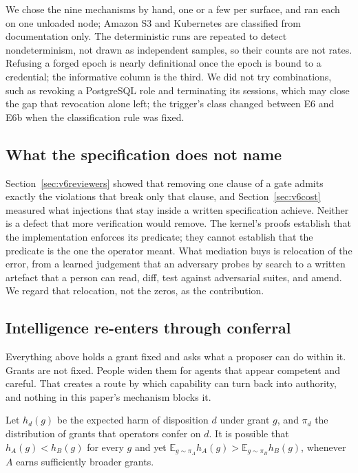  We chose the nine mechanisms by hand, one or a few per surface, and ran each on one
unloaded node; Amazon S3 and Kubernetes are classified from documentation only. The deterministic runs are repeated to
detect nondeterminism, not drawn as independent samples, so their counts are not rates. Refusing a forged epoch is
nearly definitional once the epoch is bound to a credential; the informative column is the third. We did not try
combinations, such as revoking a PostgreSQL role and terminating its sessions, which may close the gap that revocation
alone left; the trigger's class changed between E6 and E6b when the classification rule was fixed.

\subsection{What the specification does not name}

Section~\ref{sec:v6reviewers} showed that removing one clause of a gate admits exactly the violations that break only
that clause, and Section~\ref{sec:v6cost} measured what injections that stay inside a written specification achieve.
Neither is a defect that more verification would remove. The kernel's proofs establish that the
implementation enforces its predicate; they cannot establish that the predicate is the one the operator meant. What
mediation buys is relocation of the error, from a learned judgement that an adversary probes by search to a written
artefact that a person can read, diff, test against adversarial suites, and amend. We regard that relocation, not the
zeros, as the contribution.

\subsection{Intelligence re-enters through conferral}

Everything above holds a grant fixed and asks what a proposer can do within it. Grants are not fixed. People widen
them for agents that appear competent and careful. That creates a route by which capability can turn back into
authority, and nothing in this paper's mechanism blocks it.

\begin{observation}\label{obs:conferral}
Let \(h_d(g)\) be the expected harm of disposition \(d\) under grant \(g\), and \(\pi_d\) the distribution of grants
that operators confer on \(d\). It is possible that \(h_A(g) < h_B(g)\) for every \(g\) and yet
\(\mathbb{E}_{g\sim\pi_A} h_A(g) > \mathbb{E}_{g\sim\pi_B} h_B(g)\), whenever \(A\) earns sufficiently broader grants.
\end{observation}


